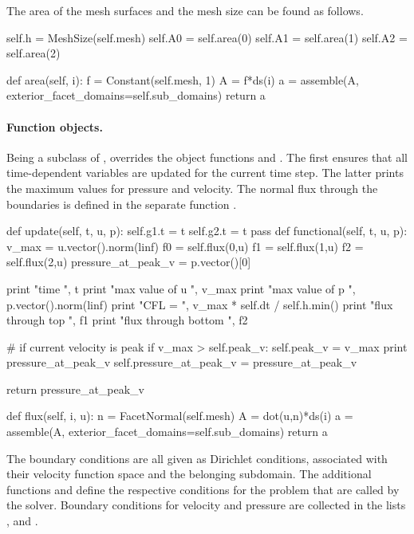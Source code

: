 The area of the mesh surfaces and the mesh size can be found as follows.
\begin{python}
self.h = MeshSize(self.mesh)
self.A0 = self.area(0)
self.A1 = self.area(1)
self.A2 = self.area(2)

def area(self, i):
	f = Constant(self.mesh, 1)
	A = f*ds(i)
	a = assemble(A, exterior_facet_domains=self.sub_domains)
	return a
\end{python}



\paragraph{Function objects.} Being a subclass of ,  overrides the object functions  and . The first ensures that all time-dependent variables are updated for the current time step. The latter prints the maximum values for pressure and velocity. The normal flux through the boundaries is defined in the separate function .
\begin{python}
def update(self, t, u, p):
	self.g1.t = t
	self.g2.t = t
	pass
def functional(self, t, u, p):
	v_max = u.vector().norm(linf)
	f0 = self.flux(0,u)
	f1 = self.flux(1,u)
	f2 = self.flux(2,u)
	pressure_at_peak_v = p.vector()[0]

	print "time ", t
	print "max value of u ", v_max
	print "max value of p ", p.vector().norm(linf)
	print "CFL = ", v_max * self.dt / self.h.min()
	print "flux through top ", f1
	print "flux through bottom ", f2

	# if current velocity is peak
	if v_max >  self.peak_v:
		self.peak_v = v_max
		print pressure_at_peak_v
		self.pressure_at_peak_v = pressure_at_peak_v

	return pressure_at_peak_v

def flux(self, i, u):
	n = FacetNormal(self.mesh)
	A = dot(u,n)*ds(i)
	a = assemble(A, exterior_facet_domains=self.sub_domains)
	return a
\end{python}

The boundary conditions are all given as Dirichlet conditions,
associated with their velocity function space and the belonging 
subdomain. The additional functions  and
 define the respective conditions for the
problem that are called by the solver. Boundary conditions for
velocity and pressure  are collected in the lists ,
 and .

